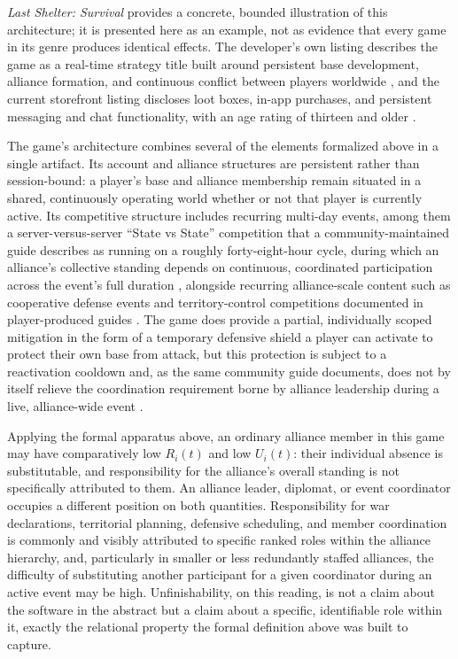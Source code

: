 \documentclass[11pt]{article}
\begin{document}
\emph{Last Shelter: Survival} provides a concrete, bounded illustration of this architecture; it is presented here as an example, not as evidence that every game in its genre produces identical effects. The developer's own listing describes the game as a real-time strategy title built around persistent base development, alliance formation, and continuous conflict between players worldwide \cite{lastshelter_playstore}, and the current storefront listing discloses loot boxes, in-app purchases, and persistent messaging and chat functionality, with an age rating of thirteen and older \cite{lastshelter_appstore}.

The game's architecture combines several of the elements formalized above in a single artifact. Its account and alliance structures are persistent rather than session-bound: a player's base and alliance membership remain situated in a shared, continuously operating world whether or not that player is currently active. Its competitive structure includes recurring multi-day events, among them a server-versus-server ``State vs State'' competition that a community-maintained guide describes as running on a roughly forty-eight-hour cycle, during which an alliance's collective standing depends on continuous, coordinated participation across the event's full duration \cite{lastshelter_swvs}, alongside recurring alliance-scale content such as cooperative defense events and territory-control competitions documented in player-produced guides \cite{lastshelter_appgamer}. The game does provide a partial, individually scoped mitigation in the form of a temporary defensive shield a player can activate to protect their own base from attack, but this protection is subject to a reactivation cooldown and, as the same community guide documents, does not by itself relieve the coordination requirement borne by alliance leadership during a live, alliance-wide event \cite{lastshelter_swvs}.

Applying the formal apparatus above, an ordinary alliance member in this game may have comparatively low $R_i(t)$ and low $U_i(t)$: their individual absence is substitutable, and responsibility for the alliance's overall standing is not specifically attributed to them. An alliance leader, diplomat, or event coordinator occupies a different position on both quantities. Responsibility for war declarations, territorial planning, defensive scheduling, and member coordination is commonly and visibly attributed to specific ranked roles within the alliance hierarchy, and, particularly in smaller or less redundantly staffed alliances, the difficulty of substituting another participant for a given coordinator during an active event may be high. Unfinishability, on this reading, is not a claim about the software in the abstract but a claim about a specific, identifiable role within it, exactly the relational property the formal definition above was built to capture.
\end{document}
